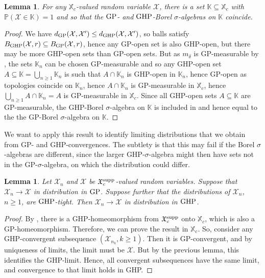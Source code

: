 \documentclass[11pt,a4paper]{article}
\newtheorem{lm}[prop]{Lemma}
\newcommand{\bP}{\mathbb{P}}
\newcommand{\bK}{\mathbb{K}}
\newcommand{\bX}{\mathbb{X}}
\newcommand{\cX}{\mathcal{X}}
\begin{document}
\begin{appendix}
\begin{lm}\label{borel} For any $\bX_c$-valued random variable $\cX$, there is a set $\bK\subseteq\bX_c$ with $\bP(\cX\in\bK)=1$ and so that the ${\rm GP}$- and ${\rm GHP}$-Borel $\sigma$-algebras
  on $\bK$ coincide.
\end{lm}
\begin{proof} We have $d_{\rm GP}(\cX,\cX^\prime)\le d_{\rm GHP}(\cX,\cX^\prime)$, so balls satisfy $B_{\rm GHP}(\cX,r)\subseteq B_{\rm GP}(\cX,r)$, hence any GP-open set is also GHP-open, but there may be more GHP-open sets than GP-open sets. But as $m_\delta$ is GP-measurable by \cite[Lemma 3.2]{ALW16}, the sets $\bK_n$ can be chosen GP-measurable and so any GHP-open set $A\subseteq\bK=\bigcup_{n\ge 1}\bK_n$ is such that $A\cap\bK_n$ is GHP-open in $\bK_n$, hence GP-open as topologies coincide on $\bK_n$, hence $A\cap\bK_n$ is GP-measurable in $\bX_c$, hence $\bigcup_{n\ge 1}A\cap\bK_n=A$ is GP-measurable in $\bX_c$. Since all GHP-open sets $A\subseteq\bK$
are GP-measurable, the GHP-Borel $\sigma$-algebra on $\bK$ is included in and hence equal to the the GP-Borel $\sigma$-algebra on $\bK$.
\end{proof}

We want to apply this result to identify limiting distributions that we obtain from GP- and GHP-convergences. The subtlety is that this may fail if the Borel $\sigma$-algebras are different, since the larger GHP-$\sigma$-algebra might then have sets not in the GP-$\sigma$-algebra, on which the distribution could differ.

\begin{lm}\label{lmA3} Let $\cX_n$ and $\cX$ be $\mathfrak{X}_c^{\rm supp}$-valued random variables. Suppose that
  $\cX_n\rightarrow\cX$ in distribution in ${\rm GP}$. Suppose further that the distributions of $\cX_n$, $n\ge 1$, are ${\rm GHP}$-tight. Then $\cX_n\rightarrow\cX$ in distribution in
  ${\rm GHP}$.
\end{lm}
\begin{proof} By \cite[Remark 5.2]{ALW16}, there is a GHP-homeomorphism from $\mathfrak{X}_c^{\rm supp}$ onto $\bX_c$, which is also a GP-homeomorphism. Therefore, we can
  prove the result in $\bX_c$. So, consider any GHP-convergent subsequence $(\cX_{n_k},k\ge 1)$. Then it is GP-convergent, and by uniqueness of limits, the limit must
  be $\cX$. But by the previous lemma, this identifies the GHP-limit. Hence, all convergent subsequences have the same limit, and convergence to that limit holds in GHP. \end{proof}


\end{appendix}
\end{document}
